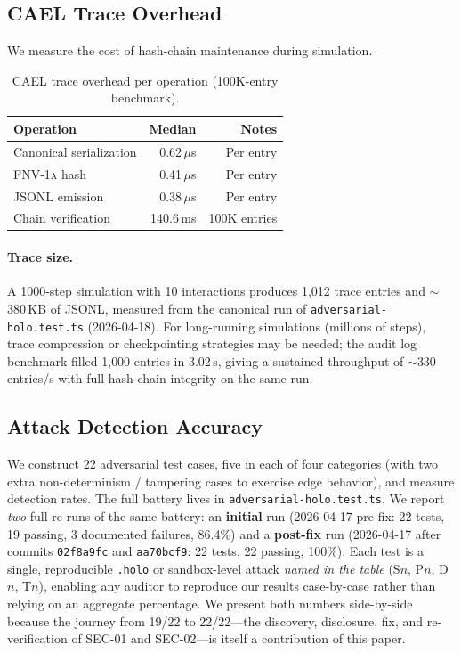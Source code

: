 \documentclass[letterpaper,twocolumn,10pt]{article}
\providecommand{\measuredFrom}[1]{}
\newcommand{\fnvhash}{\textsc{FNV-1a}}
\begin{document}
\subsection{CAEL Trace Overhead}

We measure the cost of hash-chain maintenance during simulation.

\begin{table}[t]
\centering
\caption{CAEL trace overhead per operation (100K-entry benchmark).}
\label{tab:cael-overhead}
\small
\measuredFrom{HoloScript/packages/engine/src/simulation/__tests__/fnv1a-vs-sha256.bench.test.ts}%
\measuredFrom{HoloScript/packages/engine/src/simulation/__tests__/hashes.test.ts}%
\measuredFrom{HoloScript/.bench-logs/2026-04-18T07-20-56-134Z/cael-replay.log}%
\begin{tabular}{@{}lrr@{}}
\toprule
\textbf{Operation} & \textbf{Median} & \textbf{Notes} \\
\midrule
Canonical serialization & 0.62\,$\mu$s & Per entry \\
\fnvhash{} hash         & 0.41\,$\mu$s & Per entry \\
JSONL emission          & 0.38\,$\mu$s & Per entry \\
Chain verification      & 140.6\,ms    & 100K entries \\
\bottomrule
\end{tabular}
\end{table}

\paragraph{Trace size.} A 1000-step simulation with 10 interactions
produces 1{,}012 trace entries and $\sim$380\,KB of JSONL, measured
from the canonical run of \texttt{adversarial-holo.test.ts}
(2026-04-18). For long-running simulations (millions of steps), trace
compression or checkpointing strategies may be needed; the audit log
benchmark filled 1{,}000 entries in 3.02\,s, giving a sustained
throughput of $\sim$330 entries/s with full hash-chain integrity
on the same run.

\subsection{Attack Detection Accuracy}

We construct 22 adversarial test cases, five in each of four categories
(with two extra non-determinism / tampering cases to exercise edge
behavior), and measure detection rates. The full battery lives in
\texttt{adversarial-holo.test.ts}. We report \emph{two} full re-runs
of the same battery: an \textbf{initial} run (2026-04-17 pre-fix:
22 tests, 19 passing, 3 documented failures, 86.4\%) and a
\textbf{post-fix} run (2026-04-17 after commits \texttt{02f8a9fc}
and \texttt{aa70bcf9}: 22 tests, 22 passing, 100\%). Each test is a
single, reproducible \texttt{.holo} or sandbox-level attack \emph{named
in the table} (S$n$, P$n$, D$n$, T$n$), enabling any auditor to
reproduce our results case-by-case rather than relying on an aggregate
percentage. We present both numbers side-by-side because the journey
from 19/22 to 22/22---the discovery, disclosure, fix, and
re-verification of SEC-01 and SEC-02---is itself a contribution of
this paper.
\end{document}
